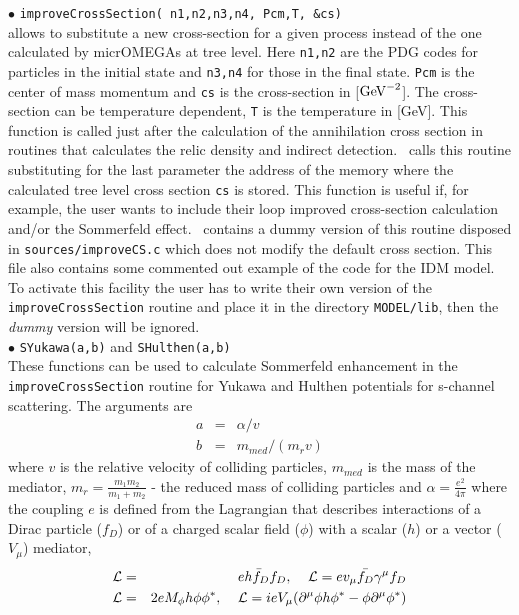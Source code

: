 \documentclass[12pt,a4paper]{article}
\begin{document}
\noindent$\bullet$ \verb|improveCrossSection( n1,n2,n3,n4, Pcm,T, &cs)|\\
allows to substitute a new cross-section for a given process instead of the one calculated by
micrOMEGAs at tree level.  Here \verb|n1,n2| are the PDG codes  for  particles in the initial state and
\verb|n3,n4| for those in the final state. \verb|Pcm| is the center of mass momentum and \verb|cs| is the cross-section in
[${\rm GeV}^{-2}$].  The cross-section can be temperature dependent, 
\verb|T| is the temperature in [GeV]. This function is called just after the calculation
of the annihilation cross section in routines that calculates the  relic density
and indirect detection. \micro\  calls this routine substituting
for the last parameter the address of the memory where the calculated tree level cross section
{\tt cs} is
stored.
 This function is useful if, for example, the user wants to include their loop improved cross-section 
calculation and/or the  Sommerfeld effect.
 \micro\ contains  a dummy version of this routine  disposed in 
\verb|sources/improveCS.c| which does not modify the default  cross section.
 This file also  contains some commented out example of the code for the IDM model.
 To activate this facility  the user has to write their own
version of the {\tt improveCrossSection} routine and place it  in the directory
\verb|MODEL/lib|,  then the {\it dummy} version will be ignored.
\\
%
\noindent$\bullet$ \verb|SYukawa(a,b)| and \verb|SHulthen(a,b)|   \\ 
These functions can be used  to calculate   Sommerfeld enhancement  in the {\tt improveCrossSection} routine for Yukawa and Hulthen potentials
for s-channel  scattering.  The arguments  are 
\begin{eqnarray}
   a &=& \alpha/v \\
   b &=& m_{med}/(m_r v)    
\end{eqnarray} 
where $v$ is the relative velocity of colliding particles, $m_{med}$ is the mass of the
mediator, $m_r=\frac{m_1 m_2}{m_1+m_2}$ - the reduced mass of colliding
particles and $\alpha=\frac{e^2}{4\pi}$ where the coupling $e$ is defined from the Lagrangian
that describes interactions of a Dirac particle ($f_D$)  or of a  charged  scalar field  ($\phi$)   with a scalar ($h$) or a vector ($V_\mu$) mediator, 
\begin{eqnarray}
 {\cal L}&=& e h \bar{f}_D f_D, \;\;\;\;  {\cal L}=e v_\mu \bar{f_D}\gamma^\mu f_D\nonumber\\
 {\cal L}&=&2e M_\phi h \phi\phi^*, \;\;\;\;  {\cal L}= i e V_\mu  (\partial^\mu \phi h \phi^* - \phi \partial^\mu \phi^*) 
\end{eqnarray}
\end{document}
